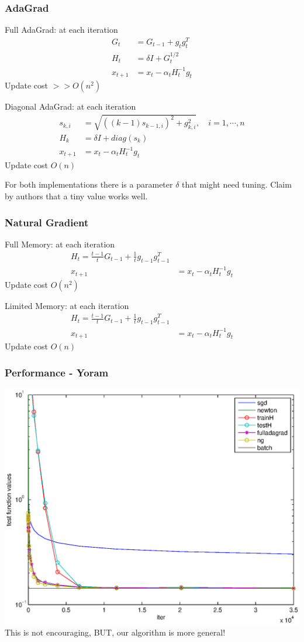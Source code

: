 \documentclass{beamer}
\begin{document}
\begin{frame}
	\frametitle{AdaGrad}
	Full AdaGrad: at each iteration
	\begin{align*}
	 G_t &= G_{t-1}+ g_t  g_t^T\\
	 H_t &= \delta I + G_t^{1/2}\\
	 x_{t+1} &= x_{t} - \alpha_t H_t^{-1} g_t
	\end{align*}
	Update cost $>>O(n^2)$
	
	Diagonal AdaGrad:  at each iteration
	\begin{align*}
     s_{k,i} &=\sqrt{ ((k-1) s_{k-1,i})^2 +g_{k,i}^2 }, \quad i=1, \cdots, n \\
     H_k &=\delta I + diag(s_k) \\
	 x_{t+1} &= x_{t} - \alpha_t H_t^{-1} g_t
	\end{align*}
	Update cost $O(n)$
	
	For both implementations there is a parameter $\delta$ that might need tuning. Claim by authors that a tiny value works well. 
\end{frame}


\begin{frame}
	\frametitle{Natural Gradient}
	Full Memory: at each iteration
	\begin{align*}
	 H_{t} = \frac{t-1}{t}G_{t-1} + \frac{1}{t} g_{t-1} g_{t-1}^T \\
	 x_{t+1} &= x_{t} - \alpha_t H_t^{-1} g_t
	\end{align*}
	Update cost $O(n^2)$
	
	Limited Memory: at each iteration
	\begin{align*} 
	 H_{t} = \frac{t-1}{t}G_{t-1} + \frac{1}{t} g_{t-1} g_{t-1}^T\\
	 x_{t+1} &= x_{t} - \alpha_t H_t^{-1} g_t
	\end{align*}
	Update cost $O(n)$
\end{frame}

\begin{frame}
	\frametitle{Performance - Yoram }
	\includegraphics[scale=0.4]{figures/P01.eps}
	This is not encouraging, BUT, our algorithm is more general!
\end{frame}
\end{document}
